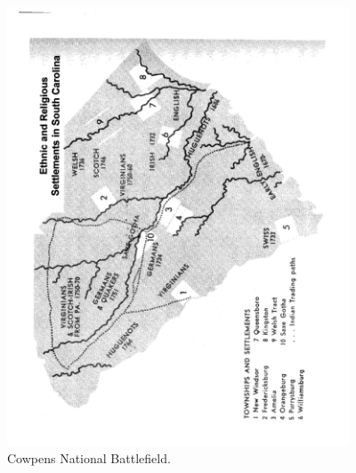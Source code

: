 \begin{figure}[h]
	\singlespacing
	\begin{center}
	  \includegraphics[angle=-90,width=4in]{gfx/rauch_battle_2007_02_p19}
	\end{center}
	\caption{Cowpens National Battlefield.}
	\label{cowppark97}
\end{figure}

